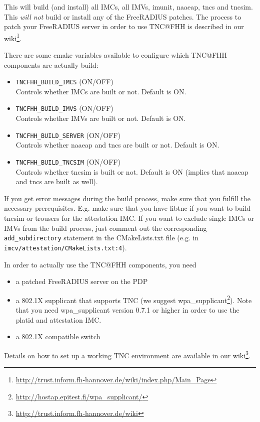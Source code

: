 \documentclass[a4paper,10pt]{scrartcl}
\begin{document}
This will build (and install) all IMCs, all IMVs, imunit, naaeap, tncs and tncsim. This
\emph{will not} build or install any of the FreeRADIUS patches. The process to patch your FreeRADIUS server in order to use TNC@FHH is described in our wiki\footnote{\url{http://trust.inform.fh-hannover.de/wiki/index.php/Main_Page}}.

There are some cmake variables available to configure which TNC@FHH components are actually build:
\begin{itemize}
	\item \texttt{TNCFHH\_BUILD\_IMCS} (ON/OFF)\\ Controls whether IMCs are built or not. Default is ON.
	\item \texttt{TNCFHH\_BUILD\_IMVS} (ON/OFF)\\ Controls whether IMVs are built or not. Default is ON.
	\item \texttt{TNCFHH\_BUILD\_SERVER} (ON/OFF)\\ Controls whether naaeap and tncs are built or not. Default is ON.
	\item \texttt{TNCFHH\_BUILD\_TNCSIM} (ON/OFF)\\ Controls whether tncsim is built or not. Default is ON (implies that
	naaeap and tncs are built as well).
\end{itemize}

If you get error messages during the  build process, make sure that you fulfill the necessary prerequisites. E.g. make sure that you have libtnc
if you want to build tncsim or trousers for the attestation IMC. If you want to exclude single IMCs or IMVs from the build process, just comment out
the corresponding \texttt{add\_subdirectory} statement in the CMakeLists.txt file (e.g. in \texttt{imcv/attestation/CMakeLists.txt:4}).

In order to actually use the TNC@FHH components, you need
\begin{itemize}
	\item a patched FreeRADIUS server on the PDP
	\item a 802.1X supplicant that supports TNC (we suggest wpa\_supplicant\footnote{\url{http://hostap.epitest.fi/wpa_supplicant/}}). Note that you need wpa\_supplicant version 0.7.1 or higher in order to use the platid and attestation IMC.
	\item a 802.1X compatible switch
\end{itemize}
Details on how to set up a working TNC environment are available in our wiki\footnote{\url{http://trust.inform.fh-hannover.de/wiki}}.
\end{document}
